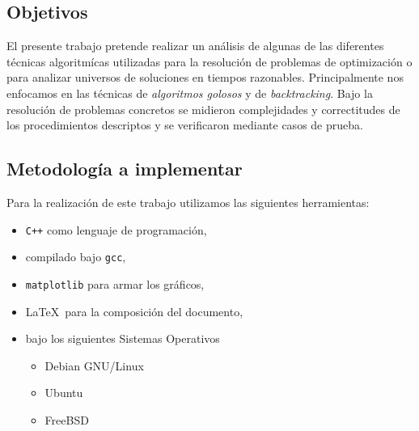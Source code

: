 \documentclass[11pt, a4paper, twoside]{article}
\begin{document}
{}

\subsection{Objetivos}

El presente trabajo pretende realizar un análisis de algunas de las diferentes
técnicas algoritmícas utilizadas para la resolución de problemas de optimización
o para analizar universos de soluciones en tiempos razonables.
Principalmente nos enfocamos en las técnicas de \textit{algoritmos golosos}
y de \textit{backtracking}. Bajo la resolución de problemas concretos
se midieron complejidades y correctitudes de los procedimientos descriptos
y se verificaron mediante casos de prueba.

\subsection{Metodología a implementar}

Para la realización de este trabajo utilizamos las siguientes herramientas:

\begin{itemize}
	\item \texttt{C++} como lenguaje de programación,
	\item compilado bajo \texttt{gcc},
	\item \texttt{matplotlib} para armar los gráficos,
	\item \LaTeX \ para la composición del documento,
	\item bajo los siguientes Sistemas Operativos \hfill
		\begin{itemize}
			\item Debian GNU/Linux
			\item Ubuntu
			\item FreeBSD
		\end{itemize}
\end{itemize}

\end{document}
